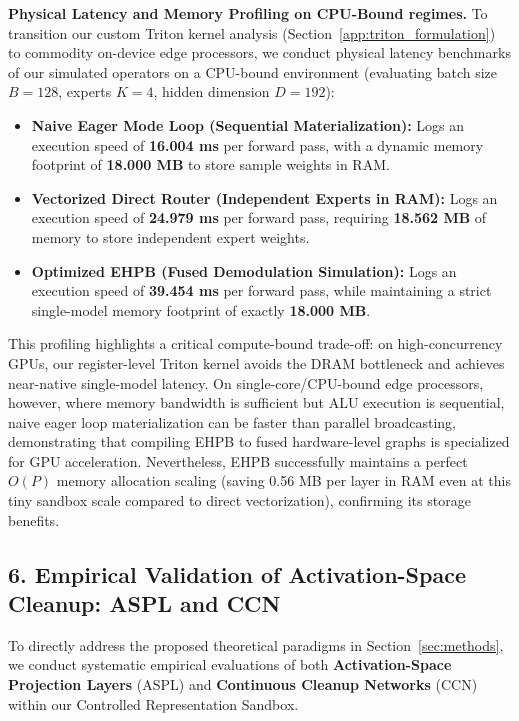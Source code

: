 \textbf{Physical Latency and Memory Profiling on CPU-Bound regimes.} To transition our custom Triton kernel analysis (Section~\ref{app:triton_formulation}) to commodity on-device edge processors, we conduct physical latency benchmarks of our simulated operators on a CPU-bound environment (evaluating batch size $B=128$, experts $K=4$, hidden dimension $D=192$):
\begin{itemize}
\item \textbf{Naive Eager Mode Loop (Sequential Materialization):} Logs an execution speed of \textbf{16.004 ms} per forward pass, with a dynamic memory footprint of \textbf{18.000 MB} to store sample weights in RAM.
\item \textbf{Vectorized Direct Router (Independent Experts in RAM):} Logs an execution speed of \textbf{24.979 ms} per forward pass, requiring \textbf{18.562 MB} of memory to store independent expert weights.
\item \textbf{Optimized EHPB (Fused Demodulation Simulation):} Logs an execution speed of \textbf{39.454 ms} per forward pass, while maintaining a strict single-model memory footprint of exactly \textbf{18.000 MB}.
\end{itemize}
This profiling highlights a critical compute-bound trade-off: on high-concurrency GPUs, our register-level Triton kernel avoids the DRAM bottleneck and achieves near-native single-model latency. On single-core/CPU-bound edge processors, however, where memory bandwidth is sufficient but ALU execution is sequential, naive eager loop materialization can be faster than parallel broadcasting, demonstrating that compiling EHPB to fused hardware-level graphs is specialized for GPU acceleration. Nevertheless, EHPB successfully maintains a perfect $O(P)$ memory allocation scaling (saving 0.56 MB per layer in RAM even at this tiny sandbox scale compared to direct vectorization), confirming its storage benefits.

\subsection{6. Empirical Validation of Activation-Space Cleanup: ASPL and CCN}
\label{subsec:activation_cleanup_empirical}

To directly address the proposed theoretical paradigms in Section~\ref{sec:methods}, we conduct systematic empirical evaluations of both \textbf{Activation-Space Projection Layers} (ASPL) and \textbf{Continuous Cleanup Networks} (CCN) within our Controlled Representation Sandbox. 

